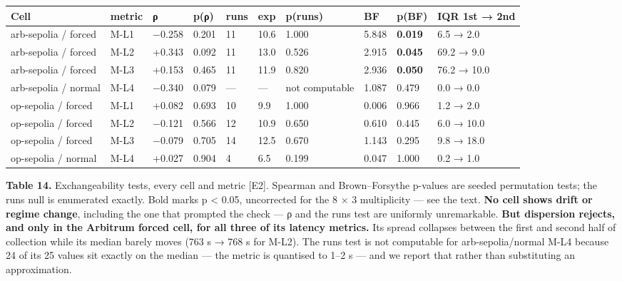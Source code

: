 \documentclass[conference]{IEEEtran}
\renewcommand{\_}{\textunderscore\allowbreak}
\begin{document}
\begin{table}[!t]
\centering
\footnotesize
\begin{tabular}{@{}llllllllll@{}}
\toprule
Cell & metric & ρ & p(ρ) & runs & exp & p(runs) & BF & p(BF) & IQR 1st → 2nd \\
\midrule
arb-sepolia / forced & M-L1 & −0.258 & 0.201 & 11 & 10.6 & 1.000 & 5.848
& \textbf{0.019} & 6.5 → 2.0 \\
arb-sepolia / forced & M-L2 & +0.343 & 0.092 & 11 & 13.0 & 0.526 & 2.915
& \textbf{0.045} & 69.2 → 9.0 \\
arb-sepolia / forced & M-L3 & +0.153 & 0.465 & 11 & 11.9 & 0.820 & 2.936
& \textbf{0.050} & 76.2 → 10.0 \\
arb-sepolia / normal & M-L4 & −0.340 & 0.079 & --- & --- & not
computable & 1.087 & 0.479 & 0.0 → 0.0 \\
op-sepolia / forced & M-L1 & +0.082 & 0.693 & 10 & 9.9 & 1.000 & 0.006 &
0.966 & 1.2 → 2.0 \\
op-sepolia / forced & M-L2 & −0.121 & 0.566 & 12 & 10.9 & 0.650 & 0.610
& 0.445 & 6.0 → 10.0 \\
op-sepolia / forced & M-L3 & −0.079 & 0.705 & 14 & 12.5 & 0.670 & 1.143
& 0.295 & 9.8 → 18.0 \\
op-sepolia / normal & M-L4 & +0.027 & 0.904 & 4 & 6.5 & 0.199 & 0.047 &
1.000 & 0.2 → 1.0 \\
\bottomrule
\end{tabular}
\par\vspace{5pt}
{\footnotesize\raggedright \textbf{Table 14.} Exchangeability tests, every cell and metric
{[}E2{]}. Spearman and Brown--Forsythe p-values are seeded permutation
tests; the runs null is enumerated exactly. Bold marks p \textless{}
0.05, uncorrected for the 8 × 3 multiplicity --- see the text.
\textbf{No cell shows drift or regime change}, including the one that
prompted the check --- ρ and the runs test are uniformly unremarkable.
\textbf{But dispersion rejects, and only in the Arbitrum forced cell,
for all three of its latency metrics.} Its spread collapses between the
first and second half of collection while its median barely moves (763 s
→ 768 s for M-L2). The runs test is not computable for
arb-sepolia/normal M-L4 because 24 of its 25 values sit exactly on the
median --- the metric is quantised to 1--2 s --- and we report that
rather than substituting an approximation.\par}
\end{table}
\end{document}
